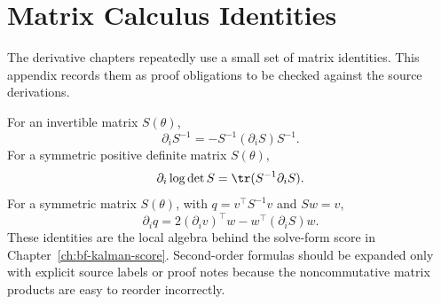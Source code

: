 \chapter{Matrix Calculus Identities}
\label{app:bf-matrix-calculus}

The derivative chapters repeatedly use a small set of matrix identities.  This
appendix records them as proof obligations to be checked against the source
derivations.

For an invertible matrix $S(\theta)$,
\[
  \partial_i S^{-1}
  =
  -S^{-1}(\partial_i S)S^{-1}.
\]
For a symmetric positive definite matrix $S(\theta)$,
\[
  \partial_i \log\det S
  =
  \tr(S^{-1}\partial_i S).
\]
For a symmetric matrix $S(\theta)$, with $q=v^\top S^{-1}v$ and $S w=v$,
\[
  \partial_i q
  =
  2(\partial_i v)^\top w
  -w^\top(\partial_i S)w.
\]
These identities are the local algebra behind the solve-form score in
Chapter~\ref{ch:bf-kalman-score}.  Second-order formulas should be expanded
only with explicit source labels or proof notes because the noncommutative
matrix products are easy to reorder incorrectly.

